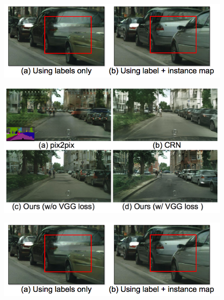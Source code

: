 \documentclass{beamer}
\begin{document}
\begin{frame}
\begin{figure}
	\centering
	\includegraphics[height=0.45\textheight]{images/instance_result}
\end{figure}
\end{frame}

\begin{frame}
\begin{figure}
	\centering
	\includegraphics[height=0.45\textheight]{images/result_1}
\end{figure}
\end{frame}

\begin{frame}
\begin{figure}
	\centering
	\includegraphics[height=0.45\textheight]{images/instance_result}
\end{figure}
\end{frame}
\end{document}

